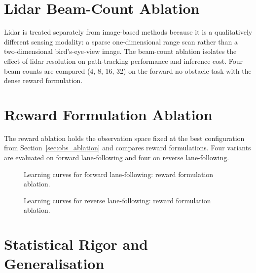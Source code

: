

\section{Lidar Beam-Count Ablation}
\label{sec:lidar_ablation}

Lidar is treated separately from image-based methods because it is a qualitatively different sensing modality: a sparse one-dimensional range scan rather than a two-dimensional bird's-eye-view image. The beam-count ablation isolates the effect of lidar resolution on path-tracking performance and inference cost. Four beam counts are compared (4, 8, 16, 32) on the forward no-obstacle task with the dense reward formulation.



\section{Reward Formulation Ablation}
\label{sec:reward_ablation}

The reward ablation holds the observation space fixed at the best configuration from Section~\ref{sec:obs_ablation} and compares reward formulations. Four variants are evaluated on forward lane-following and four on reverse lane-following.

\begin{figure}[H]
    \centering
    \caption{Learning curves for forward lane-following: reward formulation ablation.}
    \label{fig:forward_reward_ablation}
\end{figure}

\begin{figure}[H]
    \centering
    \caption{Learning curves for reverse lane-following: reward formulation ablation.}
    \label{fig:reverse_reward_ablation}
\end{figure}



\section{Statistical Rigor and Generalisation}

